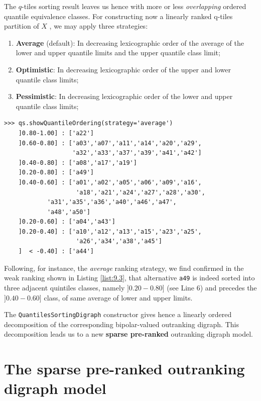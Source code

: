 The $q$-tiles sorting result leaves us hence with more or less \emph{overlapping} ordered quantile equivalence classes. For constructing now a linearly ranked q-tiles partition of $X$ , we may apply three strategies:
\begin{enumerate}[leftmargin=0.5cm,rightmargin=0.5cm]
\item \textbf{Average} (default): In decreasing lexicographic order of the average of the lower and upper quantile limits and the upper quantile class limit;
\item \textbf{Optimistic}: In decreasing lexicographic order of the upper and lower quantile class limits;
\item \textbf{Pessimistic}: In decreasing lexicographic order of the lower and upper quantile class limits;
\end{enumerate}

\begin{lstlisting}[caption={Weakly ranking the quintiles sorting result},label=list:9.3]
>>> qs.showQuantileOrdering(strategy='average')
    ]0.80-1.00] : ['a22']
    ]0.60-0.80] : ['a03','a07','a11','a14','a20','a29',
                   'a32','a33','a37','a39','a41','a42']
    ]0.40-0.80] : ['a08','a17','a19']
    ]0.20-0.80] : ['a49']
    ]0.40-0.60] : ['a01','a02','a05','a06','a09','a16',
                    'a18','a21','a24','a27','a28','a30',
		    'a31','a35','a36','a40','a46','a47',
		    'a48','a50']
    ]0.20-0.60] : ['a04','a43']
    ]0.20-0.40] : ['a10','a12','a13','a15','a23','a25',
                    'a26','a34','a38','a45']
    ]  < -0.40] : ['a44']
\end{lstlisting}
Following, for instance, the \emph{average} ranking strategy, we find confirmed in the weak ranking shown in Listing \ref{list:9.3},  that alternative \texttt{a49}  is indeed sorted into three adjacent quintiles classes, namely $]0.20-0.80]$ (see Line 6) and precedes the $]0.40-0.60]$ class, of same average of lower and upper limits.

The \texttt{QuantilesSortingDigraph} constructor gives hence a linearly ordered decomposition of the corresponding bipolar-valued outranking digraph. This decomposition leads us to a new \textbf{sparse pre-ranked} outranking digraph model.

\section{The sparse pre-ranked outranking digraph model}
\label{sec:9.3}


